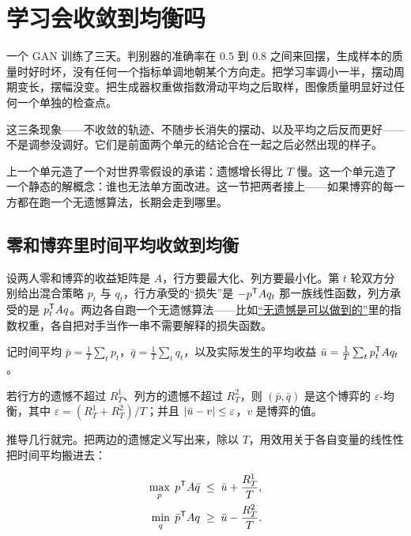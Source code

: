 \section{学习会收敛到均衡吗}
\label{sec:17-Constrained-Guarantees/06-Games-and-Equilibria/04}

一个 GAN 训练了三天。判别器的准确率在 \(0.5\) 到 \(0.8\) 之间来回摆，生成样本的质量时好时坏，没有任何一个指标单调地朝某个方向走。把学习率调小一半，摆动周期变长，摆幅没变。把生成器权重做指数滑动平均之后取样，图像质量明显好过任何一个单独的检查点。

这三条现象——不收敛的轨迹、不随步长消失的摆动、以及平均之后反而更好——不是调参没调好。它们是前面两个单元的结论合在一起之后必然出现的样子。

上一个单元造了一个对世界零假设的承诺：遗憾增长得比 \(T\) 慢。这一个单元造了一个静态的解概念：谁也无法单方面改进。这一节把两者接上——如果博弈的每一方都在跑一个无遗憾算法，长期会走到哪里。

\subsection{零和博弈里时间平均收敛到均衡}

设两人零和博弈的收益矩阵是 \(A\)，行方要最大化、列方要最小化。第 \(t\) 轮双方分别给出混合策略 \(p_t\) 与 \(q_t\)，行方承受的``损失''是 \(-p^{\mathsf{T}}Aq_t\) 那一族线性函数，列方承受的是 \(p_t^{\mathsf{T}}Aq\)。两边各自跑一个无遗憾算法——比如\hyperref[sec:17-Constrained-Guarantees/04-Online-Learning-and-Regret/02]{``无遗憾是可以做到的''}里的指数权重，各自把对手当作一串不需要解释的损失函数。

记时间平均 \(\bar p=\frac1T\sum_t p_t\)，\(\bar q=\frac1T\sum_t q_t\)，以及实际发生的平均收益 \(\bar u=\frac1T\sum_t p_t^{\mathsf{T}}Aq_t\)。

\begin{theorem}
若行方的遗憾不超过 \(R^1_T\)、列方的遗憾不超过 \(R^2_T\)，则 \((\bar p,\bar q)\) 是这个博弈的 \(\varepsilon\)-均衡，其中 \(\varepsilon=(R^1_T+R^2_T)/T\)；并且 \(\left|\bar u-v\right|\le\varepsilon\)，\(v\) 是博弈的值。
\end{theorem}

推导几行就完。把两边的遗憾定义写出来，除以 \(T\)，用效用关于各自变量的线性性把时间平均搬进去：

\[
\begin{aligned}
\max_{p}\;p^{\mathsf{T}}A\bar q&\;\le\;\bar u+\frac{R^1_T}{T},\\
\min_{q}\;\bar p^{\mathsf{T}}Aq&\;\ge\;\bar u-\frac{R^2_T}{T}.
\end{aligned}
\]

